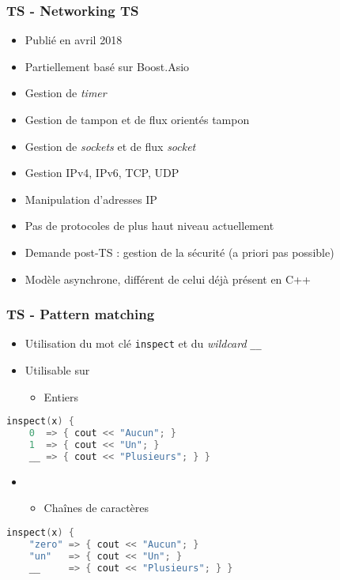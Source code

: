 \documentclass[C++.tex]{subfiles}
\begin{document}
\begin{frame}[fragile]
	\frametitle{TS - Networking TS}
	\begin{itemize}
		\item Publié en avril 2018
		\item Partiellement basé sur Boost.Asio
		\item Gestion de \textit{timer}
		\item Gestion de tampon et de flux orientés tampon
		\item Gestion de \textit{sockets} et de flux \textit{socket}
		\item Gestion IPv4, IPv6, TCP, UDP
		\item Manipulation d'adresses IP
		\item Pas de protocoles de plus haut niveau actuellement
		\item Demande post-TS : gestion de la sécurité (a priori pas possible)
		\item Modèle asynchrone, différent de celui déjà présent en C++
	\end{itemize}
\end{frame}

\begin{frame}[fragile]
	\frametitle{TS - Pattern matching}
	\begin{itemize}
		\item Utilisation du mot clé \lstinline|inspect| et du \textit{wildcard} \lstinline|__|
		\item Utilisable sur
		\begin{itemize}
			\item Entiers

		\end{itemize}
	\end{itemize}

	\begin{lstlisting}[language=C++]
inspect(x) {
	0  => { cout << "Aucun"; }
	1  => { cout << "Un"; }
	__ => { cout << "Plusieurs"; } }\end{lstlisting}

	\begin{itemize}
		\item[] 
		\begin{itemize}
			\item Chaînes de caractères
		\end{itemize}
	\end{itemize}

	\begin{lstlisting}[language=C++]
inspect(x) {
	"zero" => { cout << "Aucun"; }
	"un"   => { cout << "Un"; }
	__     => { cout << "Plusieurs"; } }\end{lstlisting}
\end{frame}
\end{document}

